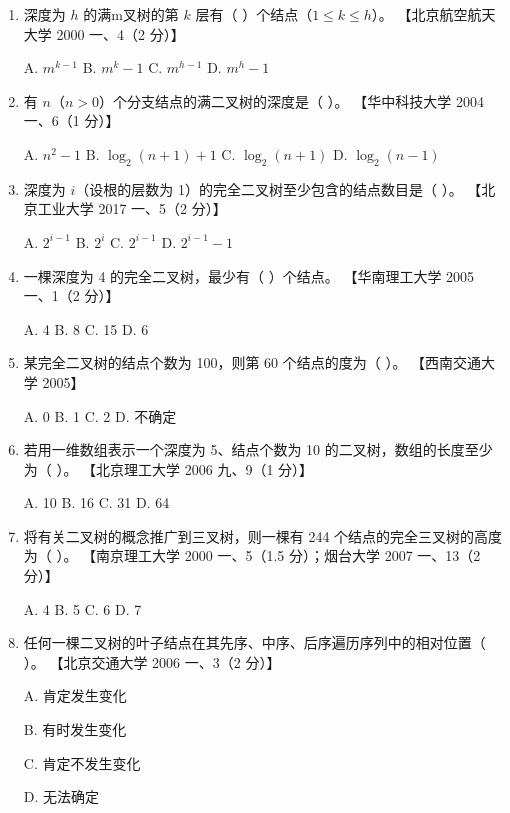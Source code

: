 \documentclass[lang=cn,newtx,10pt,scheme=chinese]{elegantbook}
\begin{document}
\begin{enumerate}
    \item 深度为 $h$ 的满m叉树的第 $k$ 层有（ ）个结点（$1 \leq k \leq h$）。  
    【北京航空航天大学 2000 一、4（2 分）】  
    
    A. $m^{k-1}$ \quad B. $m^{k} - 1$ \quad C. $m^{h-1}$ \quad D. $m^{h} - 1$  

    \item 有 $n$（$n > 0$）个分支结点的满二叉树的深度是（ ）。  
    【华中科技大学 2004 一、6（1 分）】  

    A. $n^2 - 1$ \quad B. $\log_2 (n + 1) + 1$ \quad C. $\log_2 (n + 1)$ \quad D. $\log_2 (n - 1)$  

    \item 深度为 $i$（设根的层数为 1）的完全二叉树至少包含的结点数目是（ ）。  
    【北京工业大学 2017 一、5（2 分）】  

    A. $2^{i-1}$ \quad B. $2^i$ \quad C. $2^{i - 1}$ \quad D. $2^{i-1} - 1$  

    \item 一棵深度为 4 的完全二叉树，最少有（ ）个结点。  
    【华南理工大学 2005 一、1（2 分）】  

    A. 4 \quad B. 8 \quad C. 15 \quad D. 6  

    \item 某完全二叉树的结点个数为 100，则第 60 个结点的度为（ ）。  
    【西南交通大学 2005】  

    A. 0 \quad B. 1 \quad C. 2 \quad D. 不确定  

    \item 若用一维数组表示一个深度为 5、结点个数为 10 的二叉树，数组的长度至少为（ ）。  
    【北京理工大学 2006 九、9（1 分）】 

    A. 10 \quad B. 16 \quad C. 31 \quad D. 64  

    \item 将有关二叉树的概念推广到三叉树，则一棵有 244 个结点的完全三叉树的高度为（ ）。  
    【南京理工大学 2000 一、5（1.5 分）；烟台大学 2007 一、13（2 分）】 

    A. 4 \quad B. 5 \quad C. 6 \quad D. 7  

    \item 任何一棵二叉树的叶子结点在其先序、中序、后序遍历序列中的相对位置（ ）。  
    【北京交通大学 2006 一、3（2 分）】  

    A. 肯定发生变化  

    B. 有时发生变化  

    C. 肯定不发生变化  

    D. 无法确定  


\end{enumerate}
\end{document}
